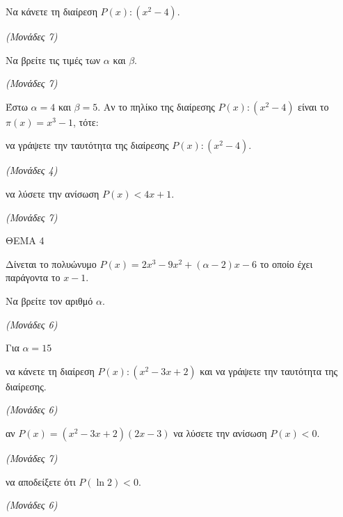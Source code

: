 \documentclass[11pt,a4paper,twoside]{book}
\newcommand{\monades}[1]{\hfill \textit{(Μονάδες #1)}}
\begin{document}
\begin{alist}
\item Να κάνετε τη διαίρεση $P(x) : (x^2 - 4)$.

\monades{7}

\item Να βρείτε τις τιμές των $\alpha$ και $\beta$.

\monades{7}

\item Έστω $\alpha = 4$ και $\beta = 5$. Αν το πηλίκο της διαίρεσης $P(x) : (x^2 - 4)$ είναι το $\pi(x) = x^3 - 1$, τότε:

\begin{rlist}
\item να γράψετε την ταυτότητα της διαίρεσης $P(x) : (x^2 - 4)$.

\monades{4}

\item να λύσετε την ανίσωση $P(x) < 4x + 1$.

\monades{7}
\end{rlist}
\end{alist}

\vspace{4mm}

ΘΕΜΑ 4

Δίνεται το πολυώνυμο $P(x) = 2x^3 - 9x^2 + (\alpha - 2)x - 6$ το οποίο έχει παράγοντα το $x - 1$.

\begin{alist}
\item Να βρείτε τον αριθμό $\alpha$.

\monades{6}

\item Για $\alpha = 15$

\begin{rlist}
\item να κάνετε τη διαίρεση $P(x) : (x^2 - 3x + 2)$ και να γράψετε την ταυτότητα της διαίρεσης.

\monades{6}

\item αν $P(x) = (x^2 - 3x + 2)(2x - 3)$ να λύσετε την ανίσωση $P(x) < 0$.

\monades{7}

\item να αποδείξετε ότι $P(\ln 2) < 0$.

\monades{6}
\end{rlist}
\end{alist}

\vspace{4mm}
\end{document}
